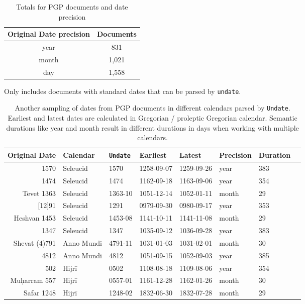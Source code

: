 \documentclass[final]{anthology-ch} %
\begin{document}
\begin{table}[h]
  \centering 
  \begin{tabular}{cc}
    \toprule
    Original Date precision & Documents \\ 
    \midrule
    year & 831 \\
    month & 1,021 \\
    day & 1,558 \\
    \bottomrule
  \end{tabular}
  \caption{Totals for PGP documents and date precision}
    \medskip
    \small
    Only includes documents with standard dates that can be parsed by \texttt{undate}.
  \label{tab:pgp-date-precisions}
\end{table}

\begin{table}[h]
  \centering 
  \begin{tabular}{rlllllll}
    \toprule
Original Date & Calendar & \texttt{Undate} & Earliest & Latest & Precision & Duration \\ 
\midrule
1570 & Seleucid & 1570 & 1258-09-07 & 1259-09-26 & year & 383 \\
1474 & Seleucid & 1474 & 1162-09-18 & 1163-09-06 & year & 354 \\
Tevet 1363 & Seleucid & 1363-10 & 1051-12-14 & 1052-01-11 & month & 29 \\
{[12]91} & Seleucid & 1291 & 0979-09-30 & 0980-09-17 & year & 353 \\
Heshvan 1453 & Seleucid & 1453-08 & 1141-10-11 & 1141-11-08 & month & 29 \\
1347 & Seleucid & 1347 & 1035-09-12 & 1036-09-28 & year &  383 \\
\midrule
Shevat (4)791 & Anno Mundi & 4791-11 & 1031-01-03 & 1031-02-01 & month & 30 \\
4812 & Anno Mundi & 4812 & 1051-09-15 & 1052-09-03 & year & 385 \\
\midrule
502 & Hijrī & 0502 & 1108-08-18 & 1109-08-06 & year & 354 \\
Muḥarram 557 & Hijrī & 0557-01 & 1161-12-28 & 1162-01-26 & month & 30 \\
Safar 1248 & Hijrī & 1248-02 & 1832-06-30 & 1832-07-28 & month & 29 \\
\bottomrule
    \bottomrule
  \end{tabular}
  \caption{Another sampling of dates from PGP documents in different calendars parsed by \texttt{Undate}. Earliest and latest dates are calculated in Gregorian / proleptic Gregorian calendar. Semantic durations like year and month result in different durations in days when working with multiple calendars.}
  \label{tab:pgp-date-durations}
\end{table}
\end{document}
